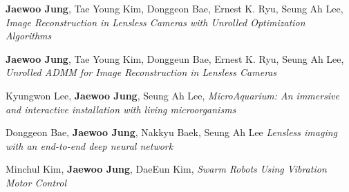 \documentclass[a4paper,12pt]{memoir} %
\begin{document}



{\textbf{Jaewoo Jung}, Tae Young Kim, Donggeon Bae, Ernest K. Ryu, Seung Ah Lee, \textit{Image Reconstruction in Lensless Cameras with Unrolled Optimization Algorithms}}



{\textbf{Jaewoo Jung}, Tae Young Kim, Donggeun Bae, Ernest K. Ryu, Seung Ah Lee, \textit{Unrolled ADMM for Image Reconstruction in Lensless Cameras}}


\clearpage %

\userinformation %

\framebreak %


{Kyungwon Lee, \textbf{Jaewoo Jung}, Seung Ah Lee, \textit{MicroAquarium: An immersive and interactive installation with living microorganisms}}



{Donggeon Bae, \textbf{Jaewoo Jung}, Nakkyu Baek, Seung Ah Lee \textit{Lensless imaging with an end-to-end deep neural network}}



{Minchul Kim, \textbf{Jaewoo Jung}, DaeEun Kim, \textit{Swarm Robots Using Vibration Motor Control}}


\Sep %

\end{document}
